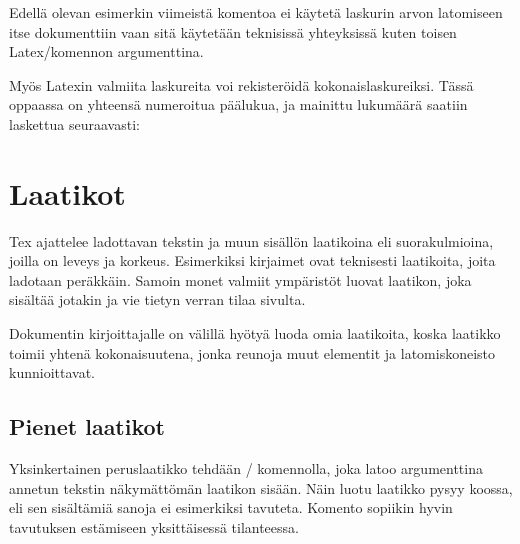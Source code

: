 \begin{koodilohkosis}
\addtocounter{oma}{1} %
\end{koodilohkosis}

\noindent
Edellä olevan esimerkin viimeistä komentoa  ei käytetä
laskurin arvon latomiseen itse dokumenttiin vaan sitä käytetään
teknisissä yhteyksissä kuten toisen Latex\-/komennon argumenttina.

Myös Latexin valmiita laskureita voi rekisteröidä kokonaislaskureiksi.
Tässä oppaassa on yhteensä  numeroitua päälukua, ja
mainittu lukumäärä saatiin laskettua seuraavasti:

\begin{koodilohkosis}
\end{koodilohkosis}

\section{Laatikot}
\label{luku/laatikot}

Tex ajattelee ladottavan tekstin ja muun sisällön laatikoina eli
suorakulmioina, joilla on leveys ja korkeus. Esimerkiksi kirjaimet ovat
teknisesti laatikoita, joita ladotaan peräkkäin. Samoin monet valmiit
ympäristöt luovat laatikon, joka sisältää jotakin ja vie tietyn verran
tilaa sivulta.

Dokumentin kirjoittajalle on välillä hyötyä luoda omia laatikoita, koska
laatikko toimii yhtenä kokonaisuutena, jonka reunoja muut elementit ja
latomiskoneisto kunnioittavat.

\subsection{Pienet laatikot}
\label{luku/laatikot-pienet}

Yksinkertainen peruslaatikko tehdään \-/ komennolla, joka
latoo argumenttina annetun tekstin näkymättömän laatikon sisään. Näin
luotu laatikko pysyy koossa, eli sen sisältämiä sanoja ei esimerkiksi
tavuteta. Komento sopiikin hyvin tavutuksen estämiseen yksittäisessä
tilanteessa.

